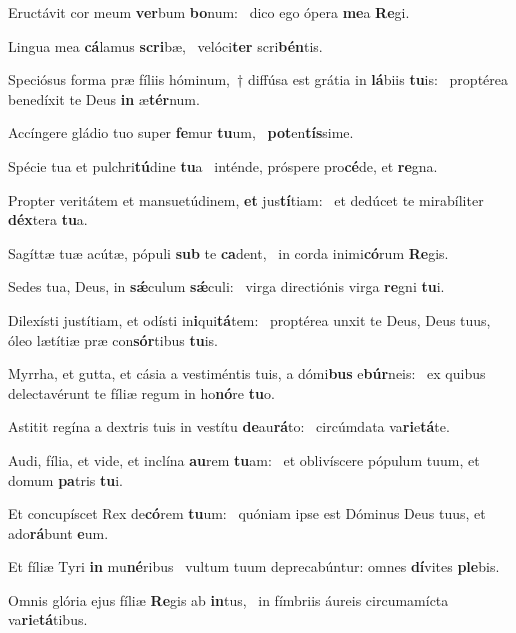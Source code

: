 \item Eructávit cor meum \textbf{ver}bum \textbf{bo}num:~\psstar{} dico ego ópera \textbf{me}a \textbf{Re}gi.
\item Lingua mea \textbf{cá}lamus \textbf{scri}bæ,~\psstar{} velóci\textbf{ter} scri\textbf{bén}tis.
\item Speciósus forma præ fíliis hóminum,~† diffúsa est grátia in \textbf{lá}biis \textbf{tu}is:~\psstar{} proptérea benedíxit te Deus \textbf{in} æ\textbf{tér}num.
\item Accíngere gládio tuo super \textbf{fe}mur \textbf{tu}um,~\psstar{} \textbf{pot}en\textbf{tís}sime.
\item Spécie tua et pulchri\textbf{tú}dine \textbf{tu}a~\psstar{} inténde, próspere pro\textbf{cé}de, et \textbf{re}gna.
\item Propter veritátem et mansuetúdinem, \textbf{et} jus\textbf{tí}tiam:~\psstar{} et dedúcet te mirabíliter \textbf{déx}tera \textbf{tu}a.
\item Sagíttæ tuæ acútæ, pópuli \textbf{sub} te \textbf{ca}dent,~\psstar{} in corda inimi\textbf{có}rum \textbf{Re}gis.
\item Sedes tua, Deus, in \textbf{sǽ}culum \textbf{sǽ}culi:~\psstar{} virga directiónis virga \textbf{re}gni \textbf{tu}i.
\item Dilexísti justítiam, et odísti in\textbf{i}qui\textbf{tá}tem:~\psstar{} proptérea unxit te Deus, Deus tuus, óleo lætítiæ præ con\textbf{sór}tibus \textbf{tu}is.
\item Myrrha, et gutta, et cásia a vestiméntis tuis, a dómi\textbf{bus} e\textbf{búr}neis:~\psstar{} ex quibus delectavérunt te fíliæ regum in ho\textbf{nó}re \textbf{tu}o.
\item Astitit regína a dextris tuis in vestítu \textbf{de}au\textbf{rá}to:~\psstar{} circúmdata va\textbf{ri}e\textbf{tá}te.
\item Audi, fília, et vide, et inclína \textbf{au}rem \textbf{tu}am:~\psstar{} et oblivíscere pópulum tuum, et domum \textbf{pa}tris \textbf{tu}i.
\item Et concupíscet Rex de\textbf{có}rem \textbf{tu}um:~\psstar{} quóniam ipse est Dóminus Deus tuus, et ado\textbf{rá}bunt \textbf{e}um.
\item Et fíliæ Tyri \textbf{in} mu\textbf{né}ribus~\psstar{} vultum tuum deprecabúntur: omnes \textbf{dí}vites \textbf{ple}bis.
\item Omnis glória ejus fíliæ \textbf{Re}gis ab \textbf{in}tus,~\psstar{} in fímbriis áureis circumamícta va\textbf{ri}e\textbf{tá}tibus.
